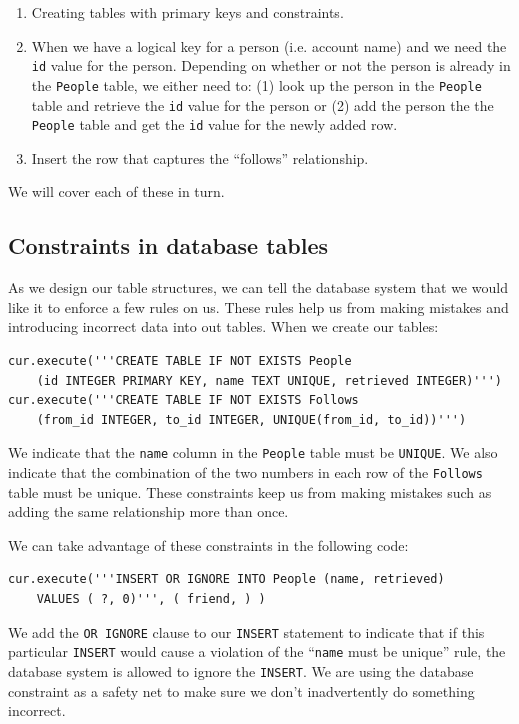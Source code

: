 \documentclass[11pt]{book}
\begin{document}
\begin{enumerate}

\item Creating tables with primary keys and constraints.

\item When we have a logical key for a person (i.e. account
name) and we need the {\tt id} value for the person.
Depending on whether or not the person is already
in the {\tt People} table, we either need to: 
(1) look up the person in the {\tt People} table and 
retrieve the {\tt id} value for the person 
or (2) add the person the the {\tt People} table and get the 
{\tt id} value for the newly added row.

\item Insert the row that captures the ``follows'' relationship.

\end{enumerate}

We will cover each of these in turn.

\subsection{Constraints in database tables}

As we design our table structures, we can tell the database system 
that we would like it to enforce a few rules on us.   These rules
help us from making mistakes and introducing incorrect data into 
out tables.   When we create our tables:

\beforeverb
\begin{verbatim}
cur.execute('''CREATE TABLE IF NOT EXISTS People 
    (id INTEGER PRIMARY KEY, name TEXT UNIQUE, retrieved INTEGER)''')
cur.execute('''CREATE TABLE IF NOT EXISTS Follows 
    (from_id INTEGER, to_id INTEGER, UNIQUE(from_id, to_id))''')
\end{verbatim}
\afterverb
%
We indicate that the {\tt name} column in the {\tt People} table must be
{\tt UNIQUE}.   We also indicate that the combination of the two numbers
in each row of the {\tt Follows} table must be unique.  These constraints
keep us from making mistakes such as adding the same relationship more than
once.

We can take advantage of these constraints in the following code:

\beforeverb
\begin{verbatim}
cur.execute('''INSERT OR IGNORE INTO People (name, retrieved) 
    VALUES ( ?, 0)''', ( friend, ) )
\end{verbatim}
\afterverb
%
We add the {\tt OR IGNORE} clause to our {\tt INSERT} statement to indicate
that if this particular {\tt INSERT} would cause a violation of the
``{\tt name} must be unique'' rule, the database system is allowed to ignore the 
{\tt INSERT}.  We are using the database constraint as a safety net
to make sure we don't inadvertently do something incorrect.
\end{document}

